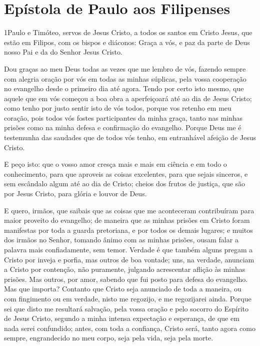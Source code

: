 \thispagestyle{empty}
\chapter*{Epístola de Paulo aos Filipenses}

\lettrine{1} Paulo e Timóteo, servos de Jesus Cristo, a todos
os santos em Cristo Jesus, que estão em Filipos, com os bispos e
diáconos: Graça a vós, e paz da parte de Deus nosso Pai e da do
Senhor Jesus Cristo.

Dou graças ao meu Deus todas as vezes que me lembro de vós,
fazendo sempre com alegria oração por vós em todas as minhas
súplicas, pela vossa cooperação no evangelho desde o primeiro
dia até agora. Tendo por certo isto mesmo, que aquele que em vós
começou a boa obra a aperfeiçoará até ao dia de Jesus Cristo;
como tenho por justo sentir isto de vós todos, porque vos
retenho em meu coração, pois todos vós fostes participantes da minha
graça, tanto nas minhas prisões como na minha defesa e confirmação
do evangelho. Porque Deus me é testemunha das saudades que de
todos vós tenho, em entranhável afeição de Jesus Cristo.

E peço isto: que o vosso amor cresça mais e mais em ciência e em
todo o conhecimento, para que aproveis as coisas excelentes,
para que sejais sinceros, e sem escândalo algum até ao dia de
Cristo; cheios dos frutos de justiça, que são por Jesus
Cristo, para glória e louvor de Deus.

E quero, irmãos, que saibais que as coisas que me aconteceram
contribuíram para maior proveito do evangelho; de maneira que
as minhas prisões em Cristo foram manifestas por toda a guarda
pretoriana, e por todos os demais lugares; e muitos dos
irmãos no Senhor, tomando ânimo com as minhas prisões, ousam falar a
palavra mais confiadamente, sem temor. Verdade é que também
alguns pregam a Cristo por inveja e porfia, mas outros de boa
vontade; uns, na verdade, anunciam a Cristo por contenção,
não puramente, julgando acrescentar aflição às minhas prisões.
Mas outros, por amor, sabendo que fui posto para defesa do
evangelho. Mas que importa? Contanto que Cristo seja
anunciado de toda a maneira, ou com fingimento ou em verdade, nisto
me regozijo, e me regozijarei ainda. Porque sei que disto me
resultará salvação, pela vossa oração e pelo socorro do Espírito de
Jesus Cristo, segundo a minha intensa expectação e esperança,
de que em nada serei confundido; antes, com toda a confiança, Cristo
será, tanto agora como sempre, engrandecido no meu corpo, seja pela
vida, seja pela morte.


